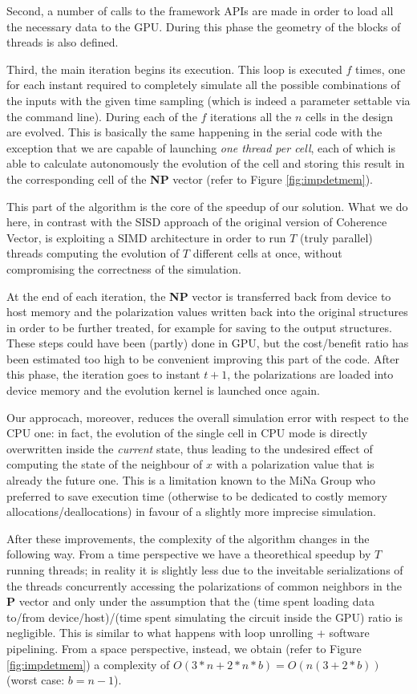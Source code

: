 Second, a number of calls to the framework APIs are made in order to load all the necessary data to the GPU. During this phase the geometry of the blocks of threads is also defined.

Third, the main iteration begins its execution. This loop is executed $f$ times, one for each instant required to completely simulate all the possible combinations of the inputs with the given time sampling (which is indeed a parameter settable via the command line). During each of the $f$ iterations all the $n$ cells in the design are evolved. This is basically the same happening in the serial code with the exception that we are capable of launching \textsl{one thread per cell}, each of which is able to calculate autonomously the evolution of the cell and storing this result in the corresponding cell of the \textbf{NP} vector (refer to Figure \ref{fig:impdetmem}). 

This part of the algorithm is the core of the speedup of our solution. What we do here, in contrast with the SISD approach of the original version of Coherence Vector, is exploiting a SIMD architecture in order to run $T$ (truly parallel) threads computing the evolution of $T$ different cells at once, without compromising the correctness of the simulation.

At the end of each iteration, the \textbf{NP} vector is transferred back from device to host memory and the polarization values written back into the original structures in order to be further treated, for example for saving to the output structures. These steps could have been (partly) done in GPU, but the cost\slash benefit ratio has been estimated too high to be convenient improving this part of the code. After this phase, the iteration goes to instant $t+1$, the polarizations are loaded into device memory and the evolution kernel is launched once again.

Our approcach, moreover, reduces the overall simulation error with respect to the CPU one: in fact, the evolution of the single cell in CPU mode is directly overwritten inside the \textsl{current} state, thus leading to the undesired effect of computing the state of the neighbour of $x$ with a polarization value that is already the future one. This is a limitation known to the MiNa Group who preferred to save execution time (otherwise to be dedicated to costly memory allocations/deallocations) in favour of a slightly more imprecise simulation.

After these improvements, the complexity of the algorithm changes in the following way. From a time perspective we have a theorethical speedup by $T$ running threads; in reality it is slightly less due to the inveitable serializations of the threads concurrently accessing the polarizations of common neighbors in the \textbf{P} vector and only under the assumption that the (time spent loading data to/from device/host)/(time spent simulating the circuit inside the GPU) ratio is negligible. This is similar to what happens with loop unrolling + software pipelining. From a space perspective, instead, we obtain (refer to Figure \ref{fig:impdetmem}) a complexity of $O(3*n+2*n*b)=O(n(3+2*b))$ (worst case: $b=n-1$).
